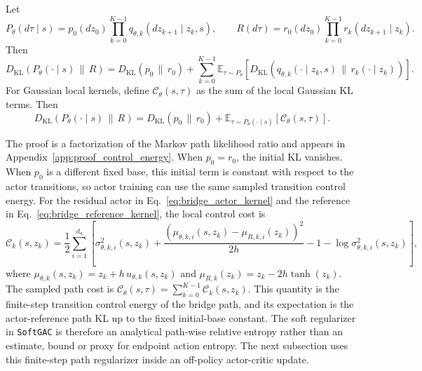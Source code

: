 \documentclass[11pt]{article}
\newcommand{\myalgo}{\texttt{SoftGAC}\xspace}
\begin{document}
\begin{lemma}
\label{lem:control_energy}
Let
\begin{equation}
  P_\theta(d\tau\mid s)
  =
  p_0(dz_0)
  \prod_{k=0}^{K-1}
  q_{\theta,k}(dz_{k+1}\mid z_k,s),
  \qquad
  R(d\tau)
  =
  r_0(dz_0)
  \prod_{k=0}^{K-1}
  r_k(dz_{k+1}\mid z_k).
\end{equation}
Then
\begin{equation}
  D_{\mathrm{KL}}
  \left(
    P_\theta(\cdot\mid s)
    \,\|\,R
  \right)
  =
  D_{\mathrm{KL}}
  \left(
    p_0
    \,\|\,
    r_0
  \right)
  +
  \sum_{k=0}^{K-1}
  \mathbb E_{\tau\sim P_\theta}
  \left[
    D_{\mathrm{KL}}
    \left(
      q_{\theta,k}(\cdot\mid z_k,s)
      \,\|\,r_k(\cdot\mid z_k)
    \right)
  \right].
  \label{eq:local_kl_sum}
\end{equation}
For Gaussian local kernels, define $\mathcal C_\theta(s,\tau)$ as the sum of the local Gaussian KL terms. Then
\begin{equation}
  D_{\mathrm{KL}}
  \left(
    P_\theta(\cdot\mid s)
    \,\|\,R
  \right)
  =
  D_{\mathrm{KL}}
  \left(
    p_0
    \,\|\,
    r_0
  \right)
  +
  \mathbb E_{\tau\sim P_\theta(\cdot\mid s)}
  \left[
    \mathcal C_\theta(s,\tau)
  \right].
  \label{eq:path_kl_control_energy}
\end{equation}
\end{lemma}

The proof is a factorization of the Markov path likelihood ratio and appears in Appendix~\ref{app:proof_control_energy}. When $p_0=r_0$, the initial KL vanishes. When $p_0$ is a different fixed base, this initial term is constant with respect to the actor transitions, so actor training can use the same sampled transition control energy. For the residual actor in Eq.~\eqref{eq:bridge_actor_kernel} and the reference in Eq.~\eqref{eq:bridge_reference_kernel}, the local control cost is
\begin{equation}
  \mathcal C_k(s,z_k)
  =
  \frac{1}{2}
  \sum_{i=1}^{d_a}
  \left[
    \sigma_{\theta,k,i}^2(s,z_k)
    +
    \frac{
      \left(
        \mu_{\theta,k,i}(s,z_k)
        -
        \mu_{R,k,i}(z_k)
      \right)^2
    }{
      2h
    }
    -
    1
    -
    \log \sigma_{\theta,k,i}^2(s,z_k)
  \right],
  \label{eq:local_control_cost}
\end{equation}
where $\mu_{\theta,k}(s,z_k)=z_k+h\,u_{\theta,k}(s,z_k)$ and $\mu_{R,k}(z_k)=z_k-2h\tanh(z_k)$. The sampled path cost is $\mathcal C_\theta(s,\tau)=\sum_{k=0}^{K-1}\mathcal C_k(s,z_k)$. This quantity is the finite-step transition control energy of the bridge path, and its expectation is the actor-reference path KL up to the fixed initial-base constant. The soft regularizer in \myalgo is therefore an analytical path-wise relative entropy rather than an estimate, bound or proxy for endpoint action entropy. The next subsection uses this finite-step path regularizer inside an off-policy actor-critic update.
\end{document}
